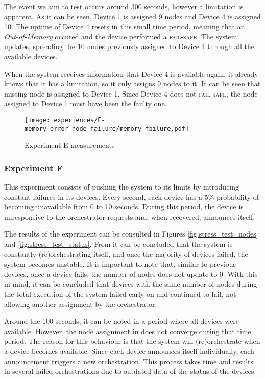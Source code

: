 The event we aim to test occurs around 300 seconds, however a limitation is apparent. As it can be seen, Device 1 is assigned 9 nodes and Device 4 is assigned 10. The uptime of Device 4 resets in this small time period, meaning that an \textit{Out-of-Memory} occured and the device performed a \textsc{fail-safe}. The system updates, spreading the 10 nodes previously assigned to Device 4 through all the available devices. 

When the system receives information that Device 4 is available again, it already knows that it has a limitation, so it only assigns 9 nodes to it. It can be seen that missing node is assigned to Device 1. Since Device 4 does not \textsc{fail-safe}, the node assigned to Device 1 must have been the faulty one.

\begin{figure}[h]
\centering
\texttt{[image: experiences/E-memory\_error\_node\_failure/memory\_failure.pdf]}
\caption[Experiment E measurements]{Experiment E measurements}\label{fig:experiment_e_graph}
\end{figure}


\subsubsection{Experiment F}\label{sec:experiment_f}

This experiment consists of pushing the system to its limits by introducing constant failures in its devices. Every second, each device has a 5\% probability of becoming unavailable from 0 to 10 seconds. During this period, the device is unresponsive to the orchestrator requests and, when recovered, announces itself.

The results of the experiment can be consulted in Figures \ref{fig:stress_test_nodes} and \ref{fig:stress_test_status}. From  it can be concluded that the system is constantly (re)orchestrating itself, and once the majority of devices failed, the system becomes unstable. It is important to note that, similar to previous devices, once a device fails, the number of nodes does not update to 0. With this in mind, it can be concluded that devices with the same number of nodes during the total execution of the system failed early on and continued to fail, not allowing another assignment by the orchestrator.

Around the 100 seconds, it can be noted in  a period where all devices were available. However, the node assignment in  does not converge during that time period. The reason for this behaviour is that the system will (re)orchestrate when a device becomes available. Since each device announces itself individually, each announcement triggers a new orchestration. This process takes time and results in several failed orchestrations due to outdated data of the status of the devices. 

